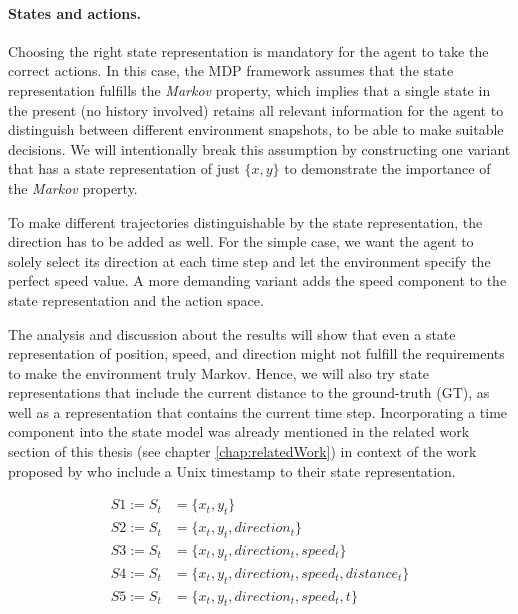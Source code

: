 \paragraph{States and actions.} Choosing the right state representation is mandatory for the agent to take the correct actions. In this case, the MDP framework assumes that the state representation fulfills the \textit{Markov} property, which implies that a single state in the present (no history involved) retains all relevant information for the agent to distinguish between different environment snapshots, to be able to make suitable decisions. We will intentionally break this assumption by constructing one variant that has a state representation of just $\{x,y\}$ to demonstrate the importance of the \textit{Markov} property.
\par
To make different trajectories distinguishable by the state representation, the direction has to be added as well. For the simple case, we want the agent to solely select its direction at each time step and let the environment specify the perfect speed value. A more demanding variant adds the speed component to the state representation and the action space.
\par
The analysis and discussion about the results will show that even a state representation of position, speed, and direction might not fulfill the requirements to make the environment truly Markov. Hence, we will also try state representations that include the current distance to the ground-truth (GT), as well as a representation that contains the current time step. Incorporating a time component into the state model was already mentioned in the related work section of this thesis (see chapter \ref{chap:relatedWork}) in context of the work proposed by \cite{liu2019vessel} who include a Unix timestamp to their state representation.

\begin{equation}
\begin{aligned}
    S1 := S_t &= \{x_t,y_t\}
\\
    S2 := S_t &= \{x_t,y_t, direction_t\}
\\
    S3 := S_t &= \{x_t,y_t, direction_t, speed_t\}
\\
    S4 := S_t &= \{x_t,y_t, direction_t, speed_t, distance_t\}
\\
    S5 := S_t &= \{x_t,y_t, direction_t, speed_t, t\}
    \end{aligned}
    \label{stateRepresentation}
\end{equation}


